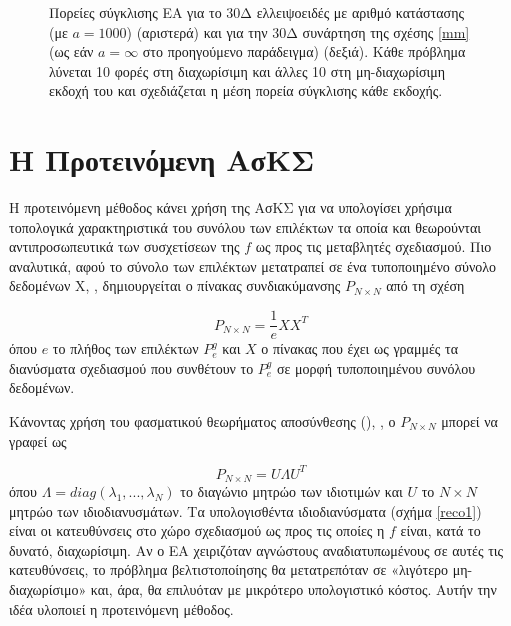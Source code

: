 \begin{figure}[h!]
\begin{minipage}[b]{0.5\linewidth}
\end{minipage}
\caption{Πορείες σύγκλισης ΕΑ για το 30Δ ελλειψοειδές με αριθμό κατάστασης (με $a=1000$) (αριστερά) και για την 30Δ συνάρτηση της σχέσης \ref{mm} (ως εάν $a=\infty$ στο προηγούμενο παράδειγμα) (δεξιά). Κάθε πρόβλημα λύνεται 10 φορές στη διαχωρίσιμη και άλλες 10 στη μη-διαχωρίσιμη εκδοχή του και σχεδιάζεται η μέση πορεία σύγκλισης κάθε εκδοχής.} 
\label{ellipse_t2}
\end{figure}



\section{Η Προτεινόμενη ΑσΚΣ}
Η προτεινόμενη μέθοδος κάνει χρήση της ΑσΚΣ για να υπολογίσει χρήσιμα τοπολογικά χαρακτηριστικά του συνόλου των επιλέκτων τα οποία και θεωρούνται αντιπροσωπευτικά των συσχετίσεων της $f$ ως προς τις μεταβλητές σχεδιασμού. Πιο αναλυτικά, αφού το σύνολο των επιλέκτων μετατραπεί σε ένα τυποποιημένο σύνολο δεδομένων Χ, \cite{Axler_1997}, δημιουργείται ο πίνακας συνδιακύμανσης $P_{N\times N}$ από τη σχέση 

\begin{equation} 
   P_{N\times N}= \frac{1}{e}XX^T
   \label{Cov_Mat} 
\end{equation}
όπου $e$ το πλήθος των επιλέκτων $P_e^g$ και $X$ ο πίνακας που έχει ως γραμμές τα διανύσματα σχεδιασμού που συνθέτουν το $P_e^g$ σε μορφή τυποποιημένου συνόλου δεδομένων.

Κάνοντας χρήση του φασματικού θεωρήματος αποσύνθεσης (),
 \cite{Axler_1997, Fodor_2002}, ο $P_{N\times N}$ μπορεί να γραφεί ως

\begin{equation} 
   P_{N\times N}= U\Lambda U^T
   \label{spectral}
\end{equation}
όπου $\Lambda\!=\!diag(\lambda_1 , . . . , \lambda_N )$ το διαγώνιο μητρώο των ιδιοτιμών και $U$ το $N\!\times\!N$ μητρώο των ιδιοδιανυσμάτων. 
Τα υπολογισθέντα ιδιοδιανύσματα (σχήμα \ref{reco1}) είναι οι κατευθύνσεις στο χώρο σχεδιασμού ως προς τις οποίες η $f$ είναι, κατά το δυνατό, διαχωρίσιμη. Αν ο ΕΑ χειριζόταν αγνώστους αναδιατυπωμένους σε αυτές τις κατευθύνσεις, το πρόβλημα βελτιστοποίησης θα μετατρεπόταν σε «λιγότερο  μη-διαχωρίσιμο» και, άρα, θα επιλυόταν με μικρότερο υπολογιστικό κόστος. Αυτήν την ιδέα υλοποιεί η προτεινόμενη μέθοδος.     

